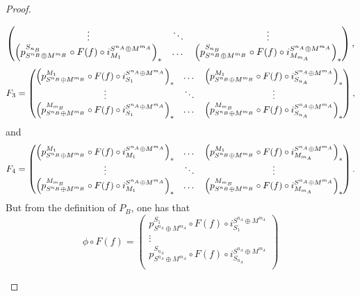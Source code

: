\begin{proof}
\begin{enumerate}
{\[\begin{pmatrix}
                    \vdots & \ddots & \vdots \\
                    \left(  p_{S^{n_B} \oplus M^{m_B}}^{S_{n_B}} \circ F(f) \circ i_{M_1}^{S^{n_A} \oplus M^{m_A}}  \right)_* & \dots & \left(  p_{S^{n_B} \oplus M^{m_B}}^{S_{n_B}} \circ F(f) \circ i_{M_{m_A}}^{S^{n_A} \oplus M^{m_A}}  \right)_* \\
                \end{pmatrix},
            \]
            \[
                F_3 = \begin{pmatrix}
                    \left(  p_{S^{n_B} \oplus M^{m_B}}^{M_1} \circ F(f) \circ i_{S_1}^{S^{n_A} \oplus M^{m_A}}  \right)_* & \dots & \left(  p_{S^{n_B} \oplus M^{m_B}}^{M_1} \circ F(f) \circ i_{S_{n_A}}^{S^{n_A} \oplus M^{m_A}}  \right)_* \\
                    \vdots & \ddots & \vdots \\
                    \left(  p_{S^{n_B} \oplus M^{m_B}}^{M_{m_B}} \circ F(f) \circ i_{S_1}^{S^{n_A} \oplus M^{m_A}}  \right)_* & \dots & \left(  p_{S^{n_B} \oplus M^{m_B}}^{M_{m_B}} \circ F(f) \circ i_{S_{n_A}}^{S^{n_A} \oplus M^{m_A}}  \right)_* \\
                \end{pmatrix},
            \]
            and
            \[
                F_4 = \begin{pmatrix}
                    \left(  p_{S^{n_B} \oplus M^{m_B}}^{M_1} \circ F(f) \circ i_{M_1}^{S^{n_A} \oplus M^{m_A}}  \right)_* & \dots & \left(  p_{S^{n_B} \oplus M^{m_B}}^{M_1} \circ F(f) \circ i_{M_{m_A}}^{S^{n_A} \oplus M^{m_A}}  \right)_* \\
                    \vdots & \ddots & \vdots \\
                    \left(  p_{S^{n_B} \oplus M^{m_B}}^{M_{m_B}} \circ F(f) \circ i_{M_1}^{S^{n_A} \oplus M^{m_A}}  \right)_* & \dots & \left(  p_{S^{n_B} \oplus M^{m_B}}^{M_{m_B}} \circ F(f) \circ i_{M_{m_A}}^{S^{n_A} \oplus M^{m_A}}  \right)_* \\
                \end{pmatrix}.
            \]
            But from the definition of \( P_B \), one has that
            \[
                \phi \circ F(f) = \begin{pmatrix}
                     p_{S^{n_A} \oplus M^{m_A}}^{S_1} \circ F(f) \circ i_{S_1}^{S^{n_A} \oplus M^{m_A}} \\
                    \vdots \\
                    p_{S^{n_A} \oplus M^{m_A}}^{S_{n_A}} \circ F(f) \circ i_{S_{n_A}}^{S^{n_A} \oplus M^{m_A}} \\

\end{pmatrix}\]}
\end{enumerate}
\end{proof}
